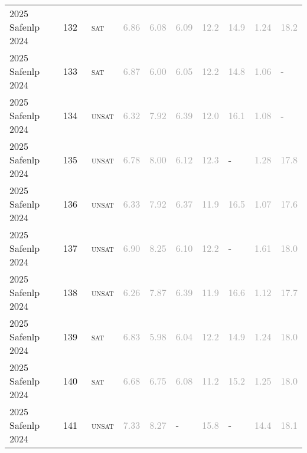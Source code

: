 \begin{center}
{\begin{longtable}{@{}llllllllll@{}}
2025 Safenlp 2024 & 132 & ~\textsc{sat} & \textcolor{darkgray}{6.86} & \textcolor{darkgray}{6.08} & \textcolor{darkgray}{6.09} & \textcolor{darkgray}{12.2} & \textcolor{darkgray}{14.9} & \textcolor{darkgray}{1.24} & \textcolor{darkgray}{18.2} \\
2025 Safenlp 2024 & 133 & ~\textsc{sat} & \textcolor{darkgray}{6.87} & \textcolor{darkgray}{6.00} & \textcolor{darkgray}{6.05} & \textcolor{darkgray}{12.2} & \textcolor{darkgray}{14.8} & \textcolor{darkgray}{1.06} & - \\
2025 Safenlp 2024 & 134 & ~\textsc{unsat} & \textcolor{darkgray}{6.32} & \textcolor{darkgray}{7.92} & \textcolor{darkgray}{6.39} & \textcolor{darkgray}{12.0} & \textcolor{darkgray}{16.1} & \textcolor{darkgray}{1.08} & - \\
2025 Safenlp 2024 & 135 & ~\textsc{unsat} & \textcolor{darkgray}{6.78} & \textcolor{darkgray}{8.00} & \textcolor{darkgray}{6.12} & \textcolor{darkgray}{12.3} & - & \textcolor{darkgray}{1.28} & \textcolor{darkgray}{17.8} \\
2025 Safenlp 2024 & 136 & ~\textsc{unsat} & \textcolor{darkgray}{6.33} & \textcolor{darkgray}{7.92} & \textcolor{darkgray}{6.37} & \textcolor{darkgray}{11.9} & \textcolor{darkgray}{16.5} & \textcolor{darkgray}{1.07} & \textcolor{darkgray}{17.6} \\
2025 Safenlp 2024 & 137 & ~\textsc{unsat} & \textcolor{darkgray}{6.90} & \textcolor{darkgray}{8.25} & \textcolor{darkgray}{6.10} & \textcolor{darkgray}{12.2} & - & \textcolor{darkgray}{1.61} & \textcolor{darkgray}{18.0} \\
2025 Safenlp 2024 & 138 & ~\textsc{unsat} & \textcolor{darkgray}{6.26} & \textcolor{darkgray}{7.87} & \textcolor{darkgray}{6.39} & \textcolor{darkgray}{11.9} & \textcolor{darkgray}{16.6} & \textcolor{darkgray}{1.12} & \textcolor{darkgray}{17.7} \\
2025 Safenlp 2024 & 139 & ~\textsc{sat} & \textcolor{darkgray}{6.83} & \textcolor{darkgray}{5.98} & \textcolor{darkgray}{6.04} & \textcolor{darkgray}{12.2} & \textcolor{darkgray}{14.9} & \textcolor{darkgray}{1.24} & \textcolor{darkgray}{18.0} \\
2025 Safenlp 2024 & 140 & ~\textsc{sat} & \textcolor{darkgray}{6.68} & \textcolor{darkgray}{6.75} & \textcolor{darkgray}{6.08} & \textcolor{darkgray}{11.2} & \textcolor{darkgray}{15.2} & \textcolor{darkgray}{1.25} & \textcolor{darkgray}{18.0} \\
2025 Safenlp 2024 & 141 & ~\textsc{unsat} & \textcolor{darkgray}{7.33} & \textcolor{darkgray}{8.27} & - & \textcolor{darkgray}{15.8} & - & \textcolor{darkgray}{14.4} & \textcolor{darkgray}{18.1} \\

\end{longtable}}
\end{center}
